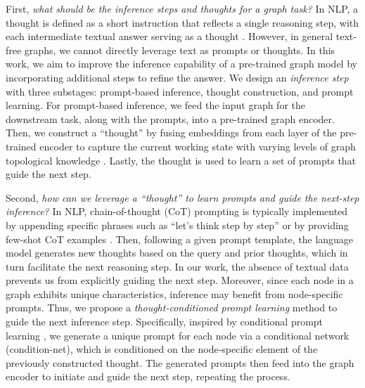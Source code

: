 First, \textit{what should be the inference steps and thoughts for a graph task?} In NLP, a thought is defined as a short instruction that reflects a single reasoning step, with each intermediate textual answer serving as a thought \cite{chu2023survey}. However, in general text-free graphs, we cannot directly leverage text as prompts or thoughts. %
In this work, we aim to improve the inference capability of a pre-trained graph model by incorporating additional steps to refine the answer. We design an \emph{inference step} with three substages: prompt-based inference, thought construction, and prompt learning. For prompt-based inference, we feed the input graph for the downstream task, along with the prompts, into a pre-trained graph encoder. Then, 
we construct a ``thought'' by fusing embeddings from each layer of the pre-trained encoder
to capture the current working state with varying levels of graph topological knowledge \cite{kipf2016semi}. Lastly, the thought is used to learn a set of prompts that guide the next step.

Second, \textit{how can we leverage a ``thought'' to learn prompts and guide the next-step inference?} In NLP, chain-of-thought (CoT) prompting is typically implemented by appending specific phrases such as ``let's think step by step'' or by providing few-shot CoT examples \cite{wei2022chain,feng2024towards}. Then, following a given prompt template, the language model generates new thoughts based on the query and prior thoughts, which in turn facilitate the next reasoning step. %
In our work, the absence of textual data prevents us from explicitly guiding the next step. 
Moreover, since each node in a graph exhibits unique characteristics, inference may benefit from node-specific prompts. Thus, we propose a \emph{thought-conditioned prompt learning} method to guide the next inference step. Specifically, inspired by conditional prompt learning \cite{zhou2022conditional}, we generate a unique prompt for each node via a conditional network (condition-net), which is conditioned on the node-specific element of the previously constructed thought. The generated prompts then feed into the graph encoder to initiate and guide the next step, repeating the process. 

